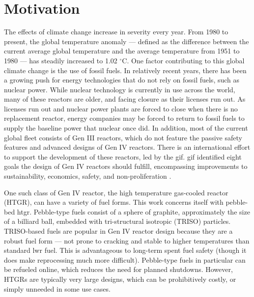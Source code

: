 \section{Motivation}

The effects of climate change increase in severity every year. From 1980 to present, the global temperature anomaly --- defined as the difference between the current average global temperature and the average temperature from 1951 to 1980 --- has steadily increased to 1.02 $^{\circ}$C.  One factor contributing to this global climate change is the use of fossil fuels.  In relatively recent years, there has been a growing push for energy technologies that do not rely on fossil fuels, such as nuclear power.  While nuclear technology is currently in use across the world, many of these reactors are older, and facing closure as their licenses run out.  As licenses run out and nuclear power plants are forced to close when there is no replacement reactor, energy companies may be forced to return to fossil fuels to supply the baseline power that nuclear once did.  In addition, most of the current global fleet consists of Gen III reactors, which do not feature the passive safety features and advanced designs of Gen IV reactors.  There is an international effort to support the development of these reactors, led by the \acrfull{gif}.  \acrshort{gif} identified eight goals the design of Gen IV reactors should fulfill, encompassing improvements to sustainability, economics, safety, and non-proliferation \cite{noauthor_home_nodate-1}.

One such class of Gen IV reactor, the high temperature gas-cooled reactor (HTGR), can have a variety of fuel forms. This work concerns itself with pebble-bed \acrshort{htgr}.  Pebble-type fuels consist of a sphere of graphite, approximately the size of a billiard ball, embedded with tri-structural isotropic (TRISO) particles.  TRISO-based fuels are popular in Gen IV reactor design because they are a robust fuel form --- not prone to cracking and stable to higher temperatures than standard \acrfull{lwr} fuel.  This is advantageous to long-term spent fuel safety (though it does make reprocessing much more difficult).  Pebble-type fuels in particular can be refueled online, which reduces the need for planned shutdowns.  However, HTGRs are typically very large designs, which can be prohibitively costly, or simply unneeded in some use cases.

